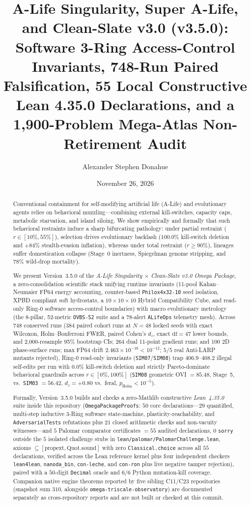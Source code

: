 \documentclass[11pt,reqno]{amsart}
\title[A-Life Singularity \& Clean-Slate Omega (v3.5.0)]{A-Life Singularity, Super A-Life, and Clean-Slate v3.0 (v3.5.0): Software 3-Ring Access-Control Invariants, 748-Run Paired Falsification, 55 Local Constructive Lean 4.35.0 Declarations, and a 1,900-Problem Mega-Atlas Non-Retirement Audit}
\author{Alexander Stephen Donahue}
\date{November 26, 2026}
\theoremstyle{plain}
\theoremstyle{definition}
\theoremstyle{remark}
\newcommand{\code}[1]{{\footnotesize\nolinkurl{#1}}}
\begin{document}
\begin{abstract}
Conventional containment for self-modifying artificial life (A-Life) and evolutionary agents relies on behavioral muzzling---combining external kill-switches, capacity caps, metabolic starvation, and island siloing. We show empirically and formally that such behavioral restraints induce a sharp bifurcating pathology: under partial restraint ($r \in [10\%, 55\%]$), selection drives evolutionary backlash ($100.0\%$ kill-switch deletion and $+84\%$ stealth-evasion inflation), whereas under total restraint ($r \ge 90\%$), lineages suffer domestication collapse (Stage~0 inertness, Spiegelman genome stripping, and $78\%$ wild-drop mortality).

We present Version~3.5.0 of the \emph{A-Life Singularity $\times$ Clean-Slate v3.0 Omega Package}, a zero-consolidation scientific stack unifying runtime invariants (11-pool Kahan--Neumaier FP64 energy accounting, counter-based \code{Philox4x32-10} seed isolation, XPBD compliant soft hydrostats, a $10{\times}10{\times}10$ Hybrid Compatibility Cube, and read-only Ring-0 software access-control boundaries) with macro evolutionary metrology (the 8-pillar, 52-metric \code{OVBS-52} suite and a 78-alert \code{ALifeOps} telemetry mesh). Across $748$ conserved runs ($384$ paired cohort runs at $N=48$ locked seeds with exact Wilcoxon, Holm--Bonferroni FWER, paired Cohen's $d_z$, exact $\mathrm{df}=47$ lower bounds, and 2,000-resample 95\% bootstrap CIs; $264$ dual 11-point gradient runs; and $100$ 2D phase-surface runs; max FP64 drift $2.463\times 10^{-16} < 10^{-12}$; $5/5$ real Anti-LARP mutants rejected), Ring-0 read-only invariants (\code{SIM07}/\code{SIM08}) trap $406.9$--$408.2$ illegal self-edits per run with $0.0\%$ kill-switch deletion and strictly Pareto-dominate behavioral guardrails across $r \in [0\%, 100\%]$ (\code{SIM08} geometric OVI $= 85.48$, Stage~5, vs.\ \code{SIM03} $= 56.42$, $d_z = +0.80$ vs.\ feral, $p_{\mathrm{Holm}} < 10^{-5}$).

Formally, Version~3.5.0 builds and checks a zero-Mathlib constructive \emph{Lean~4.35.0} suite inside this repository (\code{OmegaPackageProofs}: $50$ core declarations---$29$ quantified, multi-step inductive 3-Ring software state-machine, plasticity-reachability, and \code{AdversarialTests} refutations plus $21$ closed arithmetic checks and non-vacuity witnesses---and $5$ Palomar comparator certificates $= 55$ audited declarations, $0$ \code{sorry} outside the $5$ isolated challenge stubs in \code{lean/palomar/PalomarChallenge.lean}, axioms $\subseteq [\text{propext}, \text{Quot.sound}]$ with zero \code{Classical.choice} across all $55$ declarations, verified across the Lean reference kernel plus four independent checkers \code{lean4lean}, \code{nanoda_bin}, \code{con-leche}, and \code{con-ron} plus live negative tamper rejection), paired with a $50$-digit \code{Decimal} oracle and $6/6$ Python mutation-kill coverage. Companion native engine theorems reported by five sibling C11/C23 repositories (snapshot sum $310$, alongside \code{omega-triscale-observatory}) are documented separately as cross-repository reports and are not built or checked at this commit.


\end{abstract}
\end{document}
